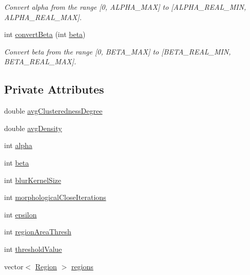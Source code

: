 \begin{DoxyCompactItemize}
\begin{DoxyCompactList}\small\item\em Convert alpha from the range \mbox{[}0, A\-L\-P\-H\-A\-\_\-\-M\-A\-X\mbox{]} to \mbox{[}A\-L\-P\-H\-A\-\_\-\-R\-E\-A\-L\-\_\-\-M\-I\-N, A\-L\-P\-H\-A\-\_\-\-R\-E\-A\-L\-\_\-\-M\-A\-X\mbox{]}. \end{DoxyCompactList}\item 
int \hyperlink{classmultiscale_1_1analysis_1_1RegionDetector_a60083ca10a42c25d67e371506cbf5620}{convert\-Beta} (int \hyperlink{classmultiscale_1_1analysis_1_1RegionDetector_a23c831170c2264dd7e59067a1a7d3c8e}{beta})
\begin{DoxyCompactList}\small\item\em Convert beta from the range \mbox{[}0, B\-E\-T\-A\-\_\-\-M\-A\-X\mbox{]} to \mbox{[}B\-E\-T\-A\-\_\-\-R\-E\-A\-L\-\_\-\-M\-I\-N, B\-E\-T\-A\-\_\-\-R\-E\-A\-L\-\_\-\-M\-A\-X\mbox{]}. \end{DoxyCompactList}\end{DoxyCompactItemize}
\subsection*{Private Attributes}
\begin{DoxyCompactItemize}
\item 
double \hyperlink{classmultiscale_1_1analysis_1_1RegionDetector_ad2614f07ff1dfa25af6f7eaa10fe8ea8}{avg\-Clusteredness\-Degree}
\item 
double \hyperlink{classmultiscale_1_1analysis_1_1RegionDetector_a96d0cab2a5cd61b3820c87581fed9548}{avg\-Density}
\item 
int \hyperlink{classmultiscale_1_1analysis_1_1RegionDetector_ab768a3bbfff9835b441a889ab2cb05a6}{alpha}
\item 
int \hyperlink{classmultiscale_1_1analysis_1_1RegionDetector_a23c831170c2264dd7e59067a1a7d3c8e}{beta}
\item 
int \hyperlink{classmultiscale_1_1analysis_1_1RegionDetector_aae6ee0ec7f0a610dd8a906c1eb181bc7}{blur\-Kernel\-Size}
\item 
int \hyperlink{classmultiscale_1_1analysis_1_1RegionDetector_a700a2f299d7c56fbd1fdbec68092f23a}{morphological\-Close\-Iterations}
\item 
int \hyperlink{classmultiscale_1_1analysis_1_1RegionDetector_acf21910fadd7c6ef2810743a78a0aeb9}{epsilon}
\item 
int \hyperlink{classmultiscale_1_1analysis_1_1RegionDetector_a1f637073a3d946d000dceed01412f19a}{region\-Area\-Thresh}
\item 
int \hyperlink{classmultiscale_1_1analysis_1_1RegionDetector_a0f7469d124c0b906d199e00ea5713007}{threshold\-Value}
\item 
vector$<$ \hyperlink{classmultiscale_1_1analysis_1_1Region}{Region} $>$ \hyperlink{classmultiscale_1_1analysis_1_1RegionDetector_aa6517ceb3a58295448d32e6e41499893}{regions}
\end{DoxyCompactItemize}
